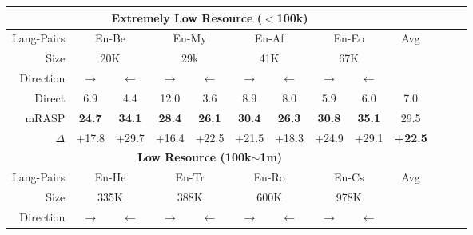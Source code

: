 \documentclass[11pt,a4paper]{article}
\newcommand{\mf}[1]{\multicolumn{2}{c}{ #1}}
\newcommand{\smf}[1]{\multicolumn{2}{c}{#1}}
\newcommand{\method}{mRASP\xspace}
\newcommand{\baseline}{Direct}
\begin{document}
\begin{table*}[htb]
\begin{center}
\begin{tabular}{rcccccccccccc}
\toprule
&\multicolumn{7}{c}{\textbf{Extremely Low Resource ($<$100k)}} \\
\midrule

Lang-Pairs& 
\mf{En-Be} &
\mf{En-My} &
\mf{En-Af} &
\mf{En-Eo} & 
Avg

\\



Size &
\smf{20K}  & 
\smf{29k}  & 
\smf{41K} & 
\smf{67K} & 

\\


Direction & 
 $\rightarrow$ &$\leftarrow$ &

 $\rightarrow$ &$\leftarrow$ &

 $\rightarrow$ &$\leftarrow$ &

 $\rightarrow$ &$\leftarrow$ \\




\midrule
\baseline &
6.9 & 4.4 & 12.0 & 3.6 &  8.9 & 8.0 & 5.9 & 6.0 & 7.0
\\


 \method &
\bf 24.7 & \bf 34.1 &
\bf 28.4 & \bf 26.1 &
\bf 30.4 & \bf 26.3 &
\bf 30.8 & \bf 35.1 &
29.5

\\

 $\Delta$ &
 +17.8 & +29.7 &
 +16.4 & +22.5  &
 +21.5 & +18.3 &
 +24.9 & +29.1 &
 \textbf{+22.5}

\\

\midrule
\midrule

&\multicolumn{7}{c}{\textbf{Low Resource (100k$\sim$1m)}} \\
\midrule


Lang-Pairs &
\mf{En-He} &
\mf{En-Tr} &
\mf{En-Ro} &
\mf{En-Cs} &
Avg
\\


Size &
\smf{335K} & 
\smf{388K} & 
\smf{600K} & 
\smf{978K}
\\


 Direction & 
 $\rightarrow$ &$\leftarrow$ &

 $\rightarrow$ &$\leftarrow$ &

 $\rightarrow$ &$\leftarrow$ &

 $\rightarrow$ &$\leftarrow$ \\





\end{tabular}
\end{center}
\end{table*}
\end{document}
